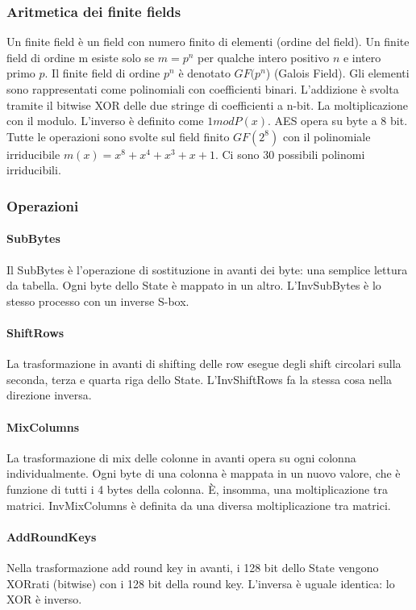 \documentclass[11pt]{article}
\begin{document}
\subsubsection{Aritmetica dei finite fields}
Un finite field è un field con numero finito di elementi (ordine del field). Un finite field di ordine m esiste solo se $m=p^n$ per qualche intero positivo $n$ e intero primo $p$.
Il finite field di ordine $p^n$ è denotato $GF(p^n$) (Galois Field). Gli elementi sono rappresentati come polinomiali con coefficienti binari. L'addizione è svolta tramite il bitwise XOR delle due stringe di coefficienti a n-bit. La moltiplicazione con il modulo. L'inverso è definito come $1 mod P(x)$. AES opera su byte a 8 bit. Tutte le operazioni sono svolte sul field finito $GF(2^8)$ con il polinomiale irriducibile $m(x) = x^8 + x^4 + x^3 + x + 1$. Ci sono 30 possibili polinomi irriducibili. 
\subsubsection{Operazioni}
\paragraph{SubBytes} Il SubBytes è l'operazione di sostituzione in avanti dei byte: una semplice lettura da tabella. Ogni byte dello State è mappato in un altro. L'InvSubBytes è lo stesso processo con un inverse S-box.
\paragraph{ShiftRows} La trasformazione in avanti di shifting delle row esegue degli shift circolari sulla seconda, terza e quarta riga dello State. L'InvShiftRows fa la stessa cosa nella direzione inversa.
\paragraph{MixColumns} La trasformazione di mix delle colonne in avanti opera su ogni colonna individualmente. Ogni byte di una colonna è mappata in un nuovo valore, che è funzione di tutti i 4 bytes della colonna. È, insomma, una moltiplicazione tra matrici.
InvMixColumns è definita da una diversa moltiplicazione tra matrici.
\paragraph{AddRoundKeys} Nella trasformazione add round key in avanti, i 128 bit dello State vengono XORrati (bitwise) con i 128 bit della round key. L'inversa è uguale identica: lo XOR è inverso.
\end{document}
